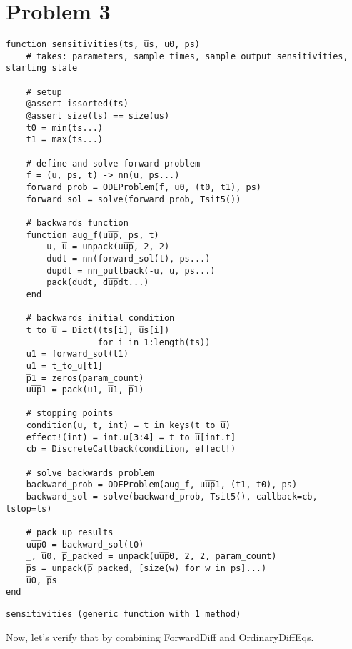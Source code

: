 \documentclass[11pt]{article}
\begin{document}
\section{Problem 3}
\label{sec:org32e03c9}
\begin{verbatim}
function sensitivities(ts, u̅s, u0, ps)
    # takes: parameters, sample times, sample output sensitivities, starting state

    # setup
    @assert issorted(ts)
    @assert size(ts) == size(u̅s)
    t0 = min(ts...)
    t1 = max(ts...)

    # define and solve forward problem
    f = (u, ps, t) -> nn(u, ps...)
    forward_prob = ODEProblem(f, u0, (t0, t1), ps)
    forward_sol = solve(forward_prob, Tsit5())

    # backwards function
    function aug_f(uu̅p̅, ps, t)
        u, u̅ = unpack(uu̅p̅, 2, 2)
        dudt = nn(forward_sol(t), ps...)
        du̅p̅dt = nn_pullback(-u̅, u, ps...)
        pack(dudt, du̅p̅dt...)
    end

    # backwards initial condition
    t_to_u̅ = Dict((ts[i], u̅s[i])
                  for i in 1:length(ts))
    u1 = forward_sol(t1)
    u̅1 = t_to_u̅[t1]
    p̅1 = zeros(param_count)
    uu̅p̅1 = pack(u1, u̅1, p̅1)

    # stopping points
    condition(u, t, int) = t in keys(t_to_u̅)
    effect!(int) = int.u[3:4] = t_to_u̅[int.t]
    cb = DiscreteCallback(condition, effect!)

    # solve backwards problem
    backward_prob = ODEProblem(aug_f, uu̅p̅1, (t1, t0), ps)
    backward_sol = solve(backward_prob, Tsit5(), callback=cb, tstop=ts)

    # pack up results
    uu̅p̅0 = backward_sol(t0)
    _, u̅0, p̅_packed = unpack(uu̅p̅0, 2, 2, param_count)
    p̅s = unpack(p̅_packed, [size(w) for w in ps]...)
    u̅0, p̅s
end
\end{verbatim}

\begin{verbatim}
sensitivities (generic function with 1 method)
\end{verbatim}


Now, let's verify that by combining ForwardDiff and OrdinaryDiffEqs.
\end{document}
